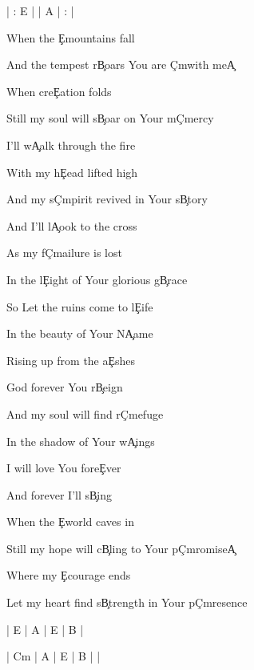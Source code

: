 \documentclass[9pt]{extarticle}
\begin{document}
\bsong

\bi
| : E |  | A | : |
\ei

\bv
When the \c{E}mountains fall

And the tempest r\c{B}oars You are \c{C\s m}with me\c{A}

When cre\c{E}ation folds

Still my soul will s\c{B}oar on Your m\c{C\s m}ercy
\ev

\bp
I'll w\c{A}alk through the fire

With my h\c{E}ead lifted high

And my s\c{C\s m}pirit revived in Your s\c{B}tory



And I'll l\c{A}ook to the cross

As my f\c{C\s m}ailure is lost

In the l\c{E}ight of Your glorious g\c{B}race
\ep

\bc
So Let the ruins come to l\c{E}ife

In the beauty of Your N\c{A}ame

Rising up from the a\c{E}shes

God forever You r\c{B}eign



And my soul will find r\c{C\s m}efuge

In the shadow of Your w\c{A}ings

I will love You fore\c{E}ver

And forever I'll s\c{B}ing
\ec

\bv
When the \c{E}world caves in

Still my hope will c\c{B}ling to Your p\c{C\s m}romise\c{A}

Where my \c{E}courage ends

Let my heart find s\c{B}trength in Your p\c{C\s m}resence
\ev



\bin
| E | A | E | B |

| C\s m | A | E | B |  |
\ein


\esong
\end{document}
